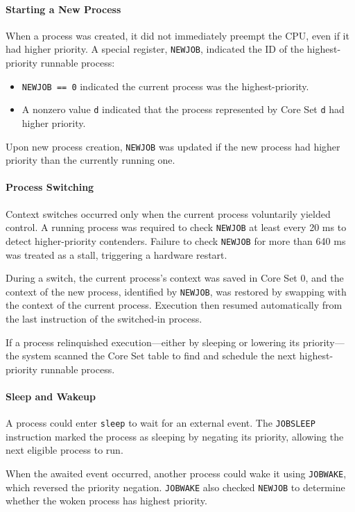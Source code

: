 \paragraph*{Starting a New Process} When a process was created, it did not immediately
preempt the CPU, even if it had higher priority. A special register, \texttt{NEWJOB},
indicated the ID of the highest-priority runnable process:
\begin{itemize}
    \item \texttt{NEWJOB == 0} indicated the current process was the highest-priority.
    \item A nonzero value \texttt{d} indicated that the process represented by Core Set
        \texttt{d} had higher priority.
\end{itemize}
Upon new process creation, \texttt{NEWJOB} was updated if the new process had higher
priority than the currently running one.

\paragraph*{Process Switching} Context switches occurred only when the current process
voluntarily yielded control. A running process was required to check \texttt{NEWJOB} at
least every 20 ms to detect higher-priority contenders. Failure to check
\texttt{NEWJOB} for more than 640 ms was treated as a stall, triggering a hardware
restart.

During a switch, the current process's context was saved in Core Set 0, and the context
of the new process, identified by \texttt{NEWJOB}, was restored by swapping with the
context of the current process. Execution then resumed automatically from the last
instruction of the switched-in process.

If a process relinquished execution—either by sleeping or lowering its priority—the
system scanned the Core Set table to find and schedule the next highest-priority
runnable process.

\paragraph*{Sleep and Wakeup} A process could enter \texttt{sleep} to wait for an
external event. The \texttt{JOBSLEEP} instruction marked the process as sleeping by
negating its priority, allowing the next eligible process to run.

When the awaited event occurred, another process could wake it using \texttt{JOBWAKE},
which reversed the priority negation. \texttt{JOBWAKE} also checked \texttt{NEWJOB} to
determine whether the woken process has highest priority.

